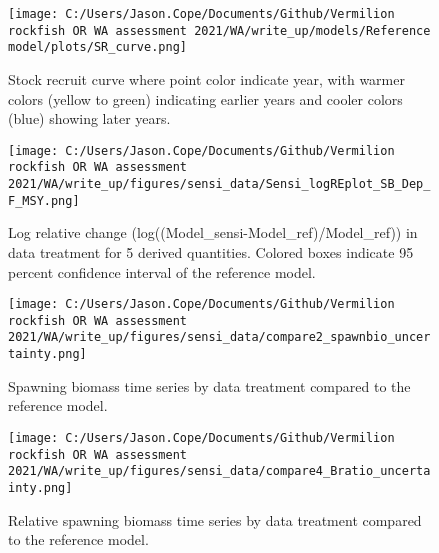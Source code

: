 \documentclass[11pt,
  english,
  a4paper,
]{article}
\begin{document}
\begin{figure}
\centering
\texttt{[image: C:/Users/Jason.Cope/Documents/Github/Vermilion rockfish OR WA assessment 2021/WA/write\_up/models/Reference model/plots/SR\_curve.png]}
\caption{Stock recruit curve where point color indicate year, with warmer colors (yellow to green) indicating earlier years and cooler colors (blue) showing later years.\label{fig:sr-curve}}
\end{figure}

\tagmcend\tagstructend


\begin{figure}
\centering
\texttt{[image: C:/Users/Jason.Cope/Documents/Github/Vermilion rockfish OR WA assessment 2021/WA/write\_up/figures/sensi\_data/Sensi\_logREplot\_SB\_Dep\_F\_MSY.png]}
\caption{Log relative change (log((Model\_sensi-Model\_ref)/Model\_ref)) in data treatment for 5 derived quantities. Colored boxes indicate 95 percent confidence interval of the reference model.\label{fig:sensi-data-RE}}
\end{figure}

\tagmcend\tagstructend


\begin{figure}
\centering
\texttt{[image: C:/Users/Jason.Cope/Documents/Github/Vermilion rockfish OR WA assessment 2021/WA/write\_up/figures/sensi\_data/compare2\_spawnbio\_uncertainty.png]}
\caption{Spawning biomass time series by data treatment compared to the reference model.\label{fig:sensi-data-ssb}}
\end{figure}

\tagmcend\tagstructend


\begin{figure}
\centering
\texttt{[image: C:/Users/Jason.Cope/Documents/Github/Vermilion rockfish OR WA assessment 2021/WA/write\_up/figures/sensi\_data/compare4\_Bratio\_uncertainty.png]}
\caption{Relative spawning biomass time series by data treatment compared to the reference model.\label{fig:sensi-data-depl}}
\end{figure}
\end{document}
